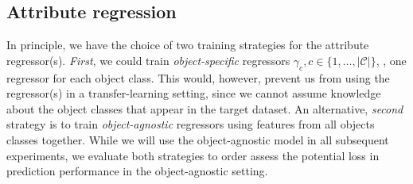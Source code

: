 \documentclass[10pt,twocolumn,letterpaper]{article}
\begin{document}
\subsection{Attribute regression}
\label{subsection:EvalCovariateRegression}

In principle, we have the choice of two training strategies
for the attribute regressor(s). \emph{First}, we could 
train \emph{object-specific} regressors 
$\gamma_c, c \in \{1,\ldots, |\mathcal{C}|\}$, \ie, one regressor
for each object class. This would, however, prevent us from 
using the regressor(s) in a transfer-learning setting, since we
cannot assume knowledge about the object classes that appear in
the target dataset. An alternative, \emph{second} 
strategy is to train \emph{object-agnostic} regressors 
using features from all objects classes together. While 
we will use the object-agnostic model in all subsequent
experiments, we evaluate both strategies to order assess 
the potential loss in prediction performance in the 
object-agnostic setting. 
\end{document}
